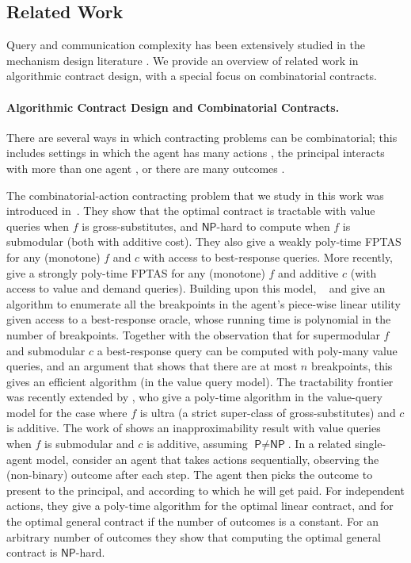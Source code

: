 \documentclass[11pt]{article}
\begin{document}
\subsection{Related Work}

Query and communication complexity has been extensively studied in the mechanism design literature  \cite[e.g.,][]{nisan2006communication,commDobz,settlingCC}. We provide an overview of related work in  algorithmic contract design, with a special focus on combinatorial contracts.

\paragraph{Algorithmic Contract Design and Combinatorial Contracts.}

There are several ways in which contracting problems can be combinatorial; this includes settings in which the agent has many actions \cite{dutting2022combinatorial}, the principal interacts with more than one agent \cite{babaioff2006combinatorial,babaioff2012combinatorialJET,duetting2022multi}, or there are many outcomes \cite{dutting2021complexity}.

The combinatorial-action contracting problem that we study in this work was introduced in~\cite{dutting2022combinatorial}. They show that the optimal contract is tractable with value queries when $f$ is gross-substitutes, and $\textsf{NP}$-hard to compute when $f$ is submodular (both with additive cost). 
They also give a weakly poly-time FPTAS for any (monotone) $f$ and $c$ with access to best-response queries.
More recently, \cite{multimulti} 
give a strongly poly-time FPTAS for any (monotone) $f$ and additive $c$ (with access to value and demand queries). 
Building upon this model, ~\cite{deo2024supermodular} and 
\cite{dutting2024combinatorial} give an algorithm to enumerate all the breakpoints in the agent's piece-wise linear utility given access to a best-response oracle, whose running time is polynomial in the number of breakpoints.
Together with the observation that for supermodular $f$ and submodular $c$ a best-response query can be computed with poly-many value queries, and an argument that shows that there are at most $n$ breakpoints, this gives an efficient algorithm (in the value query model). The tractability frontier was recently extended by \cite{FY25}, who give a poly-time algorithm in the value-query model for the case where $f$ is ultra (a strict super-class of gross-substitutes) and $c$ is additive.
The work of \cite{ezra2023Inapproximability} shows an inapproximability result with value queries when $f$ is submodular and $c$ is additive, assuming $\textsf{P} \neq\textsf{NP}$. 
In a related single-agent model, \cite{contractsSequential} consider an agent that takes actions sequentially, observing the (non-binary) outcome after each step. 
The agent then picks the outcome to present to the principal, and according to which he will get paid.
For independent actions, they give a poly-time algorithm for the optimal linear contract, and for the optimal general contract if the number of outcomes is a constant. For an arbitrary number of outcomes they show that computing the optimal general contract is $\textsf{NP}$-hard.
\end{document}
